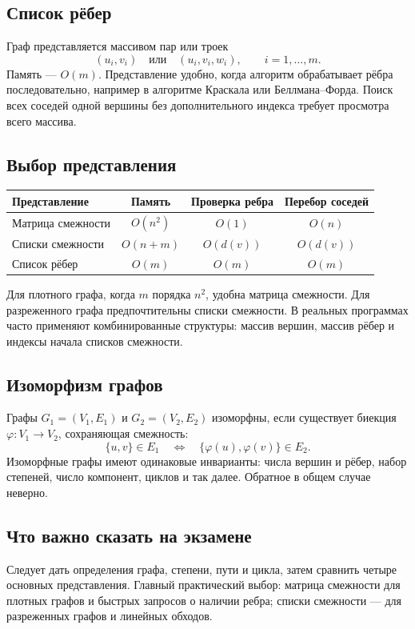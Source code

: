 \subsection{Список рёбер}

Граф представляется массивом пар или троек
\[
    (u_i,v_i)\quad\text{или}\quad(u_i,v_i,w_i),\qquad i=1,\ldots,m.
\]
Память --- $O(m)$. Представление удобно, когда алгоритм обрабатывает рёбра
последовательно, например в алгоритме Краскала или Беллмана--Форда. Поиск всех
соседей одной вершины без дополнительного индекса требует просмотра всего
массива.

\subsection{Выбор представления}

\begin{center}
\renewcommand{\arraystretch}{1.25}
\begin{tabular}{|l|c|c|c|}
\hline
Представление & Память & Проверка ребра & Перебор соседей \\
\hline
Матрица смежности & $O(n^2)$ & $O(1)$ & $O(n)$ \\
Списки смежности & $O(n+m)$ & $O(d(v))$ & $O(d(v))$ \\
Список рёбер & $O(m)$ & $O(m)$ & $O(m)$ \\
\hline
\end{tabular}
\end{center}

Для плотного графа, когда $m$ порядка $n^2$, удобна матрица смежности. Для
разреженного графа предпочтительны списки смежности. В реальных программах
часто применяют комбинированные структуры: массив вершин, массив рёбер и
индексы начала списков смежности.

\subsection{Изоморфизм графов}

Графы $G_1=(V_1,E_1)$ и $G_2=(V_2,E_2)$ изоморфны, если существует биекция
$\varphi\colon V_1\to V_2$, сохраняющая смежность:
\[
    \{u,v\}\in E_1
    \quad\Longleftrightarrow\quad
    \{\varphi(u),\varphi(v)\}\in E_2.
\]
Изоморфные графы имеют одинаковые инварианты: числа вершин и рёбер, набор
степеней, число компонент, циклов и так далее. Обратное в общем случае неверно.

\subsection{Что важно сказать на экзамене}

Следует дать определения графа, степени, пути и цикла, затем сравнить четыре
основных представления. Главный практический выбор: матрица смежности для
плотных графов и быстрых запросов о наличии ребра; списки смежности --- для
разреженных графов и линейных обходов.

\newpage